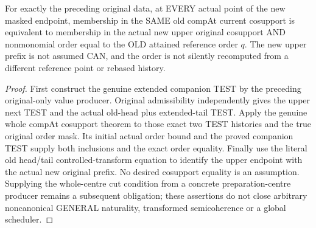 \begin{theorem}
\label{hir:original-full-value-cut-next-companion-whole-cosupport}
\leanok
For exactly the preceding original data, at EVERY actual point of the new
masked endpoint, membership in the SAME old compAt current cosupport is
equivalent to membership in the actual new upper original cosupport AND
nonmonomial order equal to the OLD attained reference order $q$. The new
upper prefix is not assumed CAN, and the order is not silently recomputed
from a different reference point or rebased history.
\end{theorem}
\begin{proof}
First construct the genuine extended companion TEST by the preceding
original-only value producer. Original admissibility independently gives
the upper next TEST and the actual old-head plus extended-tail TEST. Apply
the genuine whole compAt cosupport theorem to those exact two TEST histories
and the true original order mask. Its initial actual order bound and the
proved companion TEST supply both inclusions and the exact order equality.
Finally use the literal old head/tail controlled-transform equation to
identify the upper endpoint with the actual new original prefix. No desired
cosupport equality is an assumption. Supplying the whole-centre cut condition
from a concrete preparation-centre producer remains a subsequent obligation;
these assertions do not close arbitrary noncanonical GENERAL naturality,
transformed semicoherence or a global scheduler.
\end{proof}
